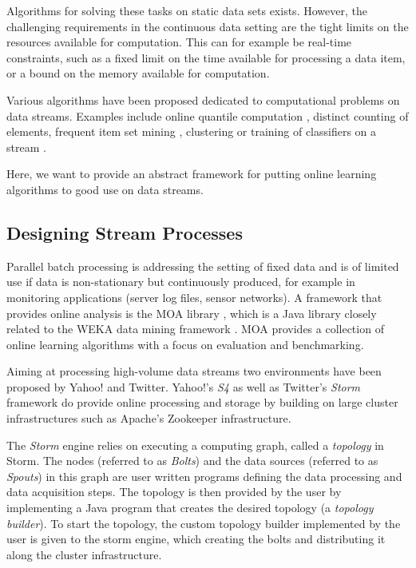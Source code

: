 Algorithms for solving these tasks on static data sets
exists. However, the challenging requirements in the continuous data
setting are the tight limits on the resources available for
computation. This can for example be real-time constraints, such as a
fixed limit on the time available for processing a data item, or a
bound on the memory available for computation.

Various algorithms have been proposed dedicated to computational
problems on data streams. Examples include online quantile computation
\cite{Greenwald/Khanna/2001a,Arasu/Manku/2004a}, distinct counting of
elements, frequent item set mining
\cite{Charikar02findingfrequent,goethals2007,Cheng06maintainingfrequent},
clustering \cite{sohler2010,Aggarwal:2003} or training of classifiers
on a stream \cite{Domingos/Hulten/2000a}.

Here, we want to provide an abstract framework for putting online
learning algorithms to good use on data streams.

\subsection{Designing Stream Processes}

Parallel batch processing is addressing the setting of fixed data and
is of limited use if data is non-stationary but continuously produced,
for example in monitoring applications (server log files, sensor
networks).  A framework that provides online analysis is the MOA
library \cite{moa}, which is a Java library closely related to the
WEKA data mining framework \cite{weka}. MOA provides a collection of
online learning algorithms with a focus on evaluation and
benchmarking.

Aiming at processing high-volume data streams two environments have
been proposed by Yahoo! and Twitter. Yahoo!'s {\em S4} \cite{s4io} as
well as Twitter's {\em Storm} \cite{storm} framework do provide online
processing and storage by building on large cluster infrastructures such
as Apache's Zookeeper infrastructure.

The {\em Storm} engine relies on executing a computing graph, called a
{\em topology} in Storm. The nodes (referred to as {\em Bolts}) and
the data sources (referred to as {\em Spouts}) in this graph are user
written programs defining the data processing and data acquisition
steps. The topology is then provided by the user by implementing a
Java program that creates the desired topology (a {\em topology
  builder}). To start the topology, the custom topology builder
implemented by the user is given to the storm engine, which creating
the bolts and distributing it along the cluster infrastructure.

